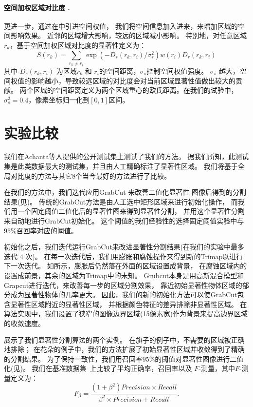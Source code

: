\documentclass[12pt,singlecolumn,letterpaper]{article}
\newcommand{\mypara}[1]{\paragraph{#1.}}
\begin{document}
\mypara{空间加权区域对比度 }
更进一步，通过在中引进空间权值，
我们将空间信息加入进来，来增加区域的空间影响效果。
近邻的区域增大影响，较远的区域减小影响。
特别地，对任意区域 $r_k$，基于空间加权区域对比度的显著性定义为：
\begin{equation}\label{equ:regContrastSpatial}
    S(r_k)=\sum_{r_k\neq r_i}\exp({-D_s(r_k,r_i)/\sigma_s^2})w(r_i) D_r(r_k, r_i)
\end{equation}
其中 $D_s(r_k, r_i)$ 为区域$r_k$ 和 $r_i$的空间距离，$\sigma_s$控制空间权值强度。
$\sigma_s$ 越大，空间权值的影响越小，导致较远区域的对比度会对当前区域显著性值做出较大的贡献。
两个区域的空间距离定义为两个区域重心的欧氏距离。在我们的试验中，$\sigma_s^2 = 0.4$，像素坐标归一化到$[0, 1]$区间。


\section{实验比较}\label{sec:Experiment}


我们在Achanta等人提供的公开测试集\cite{09cvpr/Achanta_FTSaliency}上测试了我们的方法。
据我们所知，此测试集是此类数据最大的测试集，并且由人工精确标注了显著性区域。
我们将基于全局对比度的方法与其它$8$个当今最好的方法进行了比较。



在我们的方法中，我们迭代应用GrabCut \cite{04tog/rother_grabcut} 来改善二值化显著性
图像后得到的分割结果(见)。
传统的GrabCut方法是由人工选中矩形区域来进行初始化操作，
而我们用一个固定阈值二值化后的显著性图来得到显著性分割，
并用这个显著性分割来自动地进行GrabCut初始化。
这个阈值的我们经验性的选择固定阈值实验中与$95\%$召回率对应的阈值。


初始化之后，我们迭代运行GrabCut来改进显著性分割结果(在我们的实验中最多迭代 $4$ 次)。
在每一次迭代后，我们用膨胀和腐蚀操作来得到新的Trimap以进行下一次迭代。
如所示，膨胀后仍然落在外面的区域设置成背景，
在腐蚀区域内的设置成前景，其余的区域为Trimap中的未知。
Grubcut本身是用高斯混合模型和Grapcut进行迭代，来改善每一步的区域分割效果，
靠近初始显著性物体区域的部分成为显著性物体的几率更大。
因此，我们的新的初始化方法可以使GrabCut包含显著性区域附近的显著性区域，
并根据颜色特征的差异排除非显著性区域。
在算法实现中，我们设置了狭窄的图像边界区域(15像素宽)作为背景来提高边界区域的收敛速度。


展示了我们显著性分割算法的两个实例。
在旗子的例子中，不需要的区域被正确地排除；
在花朵的例子中，我们的方法扩展了初始显著性区域并收敛得到了精确的分割结果。
为了保持一致性，我们用召回率$95\%$的阈值对显著性图像进行二值化(见)。
我们在基准数据集~\cite{09cvpr/Achanta_FTSaliency}上比较了平均正确率，召回率以及
$F$-测量，其中$F$-测量定义为：
\begin{equation}\label{equ:FMeasure}
    F_{\beta}= \frac{(1+\beta^2)Precision \times
        Recall}{\beta^2 \times Precision + Recall}.
\end{equation}
\end{document}
